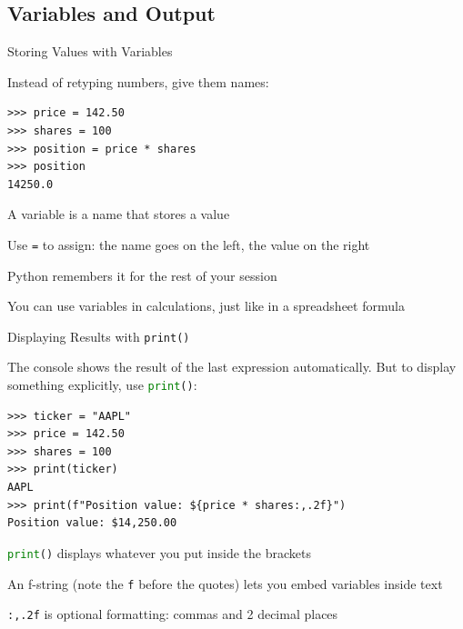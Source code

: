 \documentclass[9pt,aspectratio=169]{beamer}
\newcommand{\py}[1]{\lstinline[language=Python]{#1}}
\begin{document}
\subsection{Variables and Output}
\begin{frame}[fragile]{Storing Values with Variables}

Instead of retyping numbers, give them names:

\begin{lstlisting}
>>> price = 142.50
>>> shares = 100
>>> position = price * shares
>>> position
14250.0
\end{lstlisting}

\medskip

\bi
    \item A \alert{variable} is a name that stores a value
    \item Use \texttt{=} to assign: the name goes on the left, the value on the right
    \item Python remembers it for the rest of your session
    \item You can use variables in calculations, just like in a spreadsheet formula
\ei

\end{frame}


\begin{frame}[fragile]{Displaying Results with \texttt{print()}}

The console shows the result of the last expression automatically. But to display something explicitly, use \py{print()}:

\begin{lstlisting}
>>> ticker = "AAPL"
>>> price = 142.50
>>> shares = 100
>>> print(ticker)
AAPL
>>> print(f"Position value: ${price * shares:,.2f}")
Position value: $14,250.00
\end{lstlisting}

\medskip

\bi
    \item \py{print()} displays whatever you put inside the brackets
    \item An \alert{f-string} (note the \texttt{f} before the quotes) lets you embed variables inside text
    \item \texttt{:,.2f} is optional formatting: commas and 2 decimal places
\ei

\end{frame}
\end{document}
